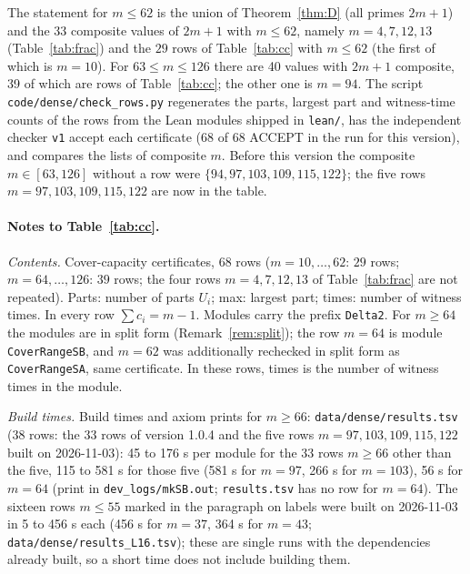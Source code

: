\documentclass[11pt]{article}
\theoremstyle{remark}
\begin{document}
\noindent The statement for $m\le 62$ is the union of Theorem~\ref{thm:D} (all primes $2m+1$) and the 33 composite values of $2m+1$ with $m\le62$, namely $m=4,7,12,13$ (Table~\ref{tab:frac}) and the $29$ rows of Table~\ref{tab:cc} with $m\le62$ (the first of which is $m=10$). For $63\le m\le126$ there are 40 values with $2m+1$ composite, 39 of which are rows of Table~\ref{tab:cc}; the other one is $m=94$. The script \texttt{code/dense/check\_rows.py} regenerates the parts, largest part and witness-time counts of the rows from the Lean modules shipped in \texttt{lean/}, has the independent checker \texttt{v1} accept each certificate (68 of 68 ACCEPT in the run for this version), and compares the lists of composite $m$. Before this version the composite $m\in[63,126]$ without a row were $\{94,97,103,109,115,122\}$; the five rows $m=97,103,109,115,122$ are now in the table.

\paragraph{Notes to Table~\ref{tab:cc}.}
\emph{Contents.} Cover-capacity certificates, $68$ rows ($m=10,\dots,62$: $29$ rows; $m=64,\dots,126$: $39$ rows; the four rows $m=4,7,12,13$ of Table~\ref{tab:frac} are not repeated). Parts: number of parts $U_i$; max: largest part; times: number of witness times. In every row $\sum c_i=m-1$. Modules carry the prefix \texttt{Delta2}. For $m\ge64$ the modules are in split form (Remark~\ref{rem:split}); the row $m=64$ is module \texttt{CoverRangeSB}, and $m=62$ was additionally rechecked in split form as \texttt{CoverRangeSA}, same certificate. In these rows, times is the number of witness times in the module.

\emph{Build times.} Build times and axiom prints for $m\ge66$: \texttt{data\slash dense\slash results.tsv} ($38$ rows: the $33$ rows of version 1.0.4 and the five rows $m=97,103,109,115,122$ built on 2026-11-03): 45 to 176 s per module for the 33 rows $m\ge66$ other than the five, 115 to 581 s for those five (581 s for $m=97$, 266 s for $m=103$), 56 s for $m=64$ (print in \texttt{dev\_logs\slash mkSB.out}; \texttt{results.tsv} has no row for $m=64$). The sixteen rows $m\le55$ marked in the paragraph on labels were built on 2026-11-03 in 5 to 456 s each (456 s for $m=37$, 364 s for $m=43$; \texttt{data\slash dense\slash results\_L16.tsv}); these are single runs with the dependencies already built, so a short time does not include building them.
\end{document}
